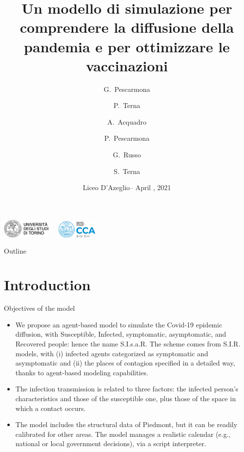 \documentclass[8pt]{beamer}
\title[S.I.s.a.R. Model] %
{Un modello di simulazione per comprendere la diffusione della pandemia e per ottimizzare le vaccinazioni}
\author[] %
{G.~Pescarmona\inst{1} \and P.~Terna\inst{2} \and A.~Acquadro\inst{1} \and P.~Pescarmona\inst{3} \and G.~Russo\inst{4}  
\and S.~Terna\inst{5}  }
\institute[] %
{
  \inst{1}%
 University of Torino, Italy
  \and
  \inst{2}%
  University of Torino, Italy, retired \& Fondazione Collegio Carlo Alberto, Honorary Fellow, Italy
 \and
  \inst{3}%
  University of Groningen, The Netherlands  
  \and
  \inst{4}%
  Centro Einaudi, Torino, Italy
  \and
  \inst{5}%
 tomorrowdata.io
  }
\date[] %
{Liceo D'Azeglio-- April \nth{20}, 2021}
\begin{document}
\begin{frame}

\includegraphics[width=0.18\textwidth]{logo_unito.png}~~~\includegraphics[width=0.15\textwidth]{CCA_Logo.png}

  \titlepage
\end{frame}

\begin{frame}{Outline}
  \tableofcontents
\end{frame}

\section{Introduction}

\begin{frame}{Objectives of the model}

  \begin{itemize}
  \item
We propose an agent-based model to simulate the Covid-19 epidemic diffusion, with Susceptible, Infected, symptomatic, asymptomatic, and Recovered people: hence the name S.I.s.a.R. The scheme comes from S.I.R. models, with (i) infected agents categorized as symptomatic and asymptomatic and (ii) the places of contagion specified in a detailed way, thanks to agent-based modeling capabilities. 

 \item
The infection transmission is related to three factors: the infected person's characteristics and those of the susceptible one, plus those of the space in which a contact occurs.

 \item
The model includes the structural data of Piedmont, but it can be readily calibrated for other areas. The model manages a realistic calendar (e.g., national or local government decisions), via a script interpreter.  


 \end{itemize}
\end{frame}
\end{document}
